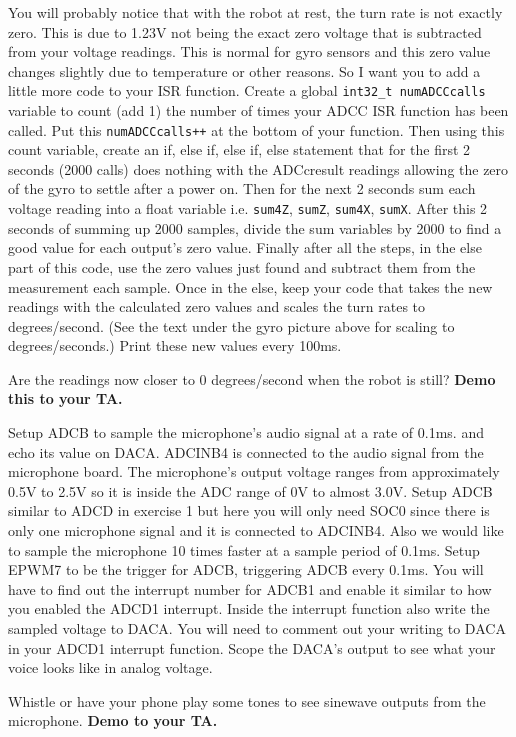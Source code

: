 \documentclass[11pt]{article}
\begin{document}
You will probably notice that with the robot at rest, the turn rate is not exactly zero. This is due to 1.23V not being the exact zero voltage that is subtracted from your voltage readings. This is normal for gyro sensors and this zero value changes slightly due to temperature or other reasons. So I want you to add a little more code to your ISR function. Create a global \texttt{int32_t numADCCcalls} variable to count (add 1) the number of times your ADCC ISR function has been called. Put this \texttt{numADCCcalls++} at the bottom of your function. Then using this count variable, create an if, else if, else if, else statement that for the first 2 seconds (2000 calls) does nothing with the ADCcresult readings allowing the zero of the gyro to settle after a power on. Then for the next 2 seconds sum each voltage reading into a float variable i.e. \texttt{sum4Z}, \texttt{sumZ}, \texttt{sum4X}, \texttt{sumX}. After this 2 seconds of summing up 2000 samples, divide the sum variables by 2000 to find a good value for each output’s zero value. Finally after all the steps, in the else part of this code, use the zero values just found and subtract them from the measurement each sample. Once in the else, keep your code that takes the new readings with the calculated zero values and scales the turn rates to degrees/second. (See the text under the gyro picture above for scaling to degrees/seconds.) Print these new values every 100ms.
%
\begin{checkoff}
        Are the readings now closer to 0 degrees/second when the robot is still?
        \textbf{Demo this to your TA.}
\end{checkoff}
%

Setup ADCB to sample the microphone’s audio signal at a rate of 0.1ms. and echo its value on DACA. ADCINB4 is connected to the audio signal from the microphone board. The microphone’s output voltage ranges from approximately 0.5V to 2.5V so it is inside the ADC range of 0V to almost 3.0V. Setup ADCB similar to ADCD in exercise 1 but here you will only need SOC0 since there is only one microphone signal and it is connected to ADCINB4. Also we would like to sample the microphone 10 times faster at a sample period of 0.1ms. Setup EPWM7 to be the trigger for ADCB, triggering ADCB every 0.1ms. You will have to find out the interrupt number for ADCB1 and enable it similar to how you enabled the ADCD1 interrupt. Inside the interrupt function also write the sampled voltage to DACA. You will need to comment out your writing to DACA in your ADCD1 interrupt function. Scope the DACA’s output to see what your voice looks like in analog voltage.
%
\begin{checkoff}
        Whistle or have your phone play some tones to see sinewave outputs from the microphone. \textbf{Demo to your TA.}
\end{checkoff}
%
\end{document}
